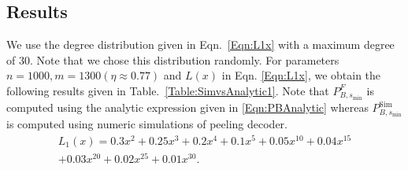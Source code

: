 
\subsection{Results}
We use the degree distribution given in Eqn.~\eqref{Eqn:L1x} with a maximum degree of 30. Note that we chose this distribution randomly. For parameters $n=1000, m=1300 ( \eta \approx 0.77)$ and $L(x)$ in Eqn. \eqref{Eqn:L1x}, we obtain the following results given in Table.~\ref{Table:SimvsAnalytic1}. Note that $P_{B,s_{\text{min}}}^F$ is computed using the analytic expression given in \eqref{Eqn:PBAnalytic} whereas $P_{B,s_{\text{min}}}^{\text{Sim}}$ is computed using numeric simulations of peeling decoder.
\begin{multline}
L_1(x)=0.3x^2+ 0.25 x^3+ 0.2 x^4 + 0.1 x^5+ 0.05 x^{10} + 0.04 x^{15}\\
 + 0.03 x^{20} + 0.02 x^{25}+ 0.01 x^{30}.
\label{Eqn:L1x}
\end{multline}

